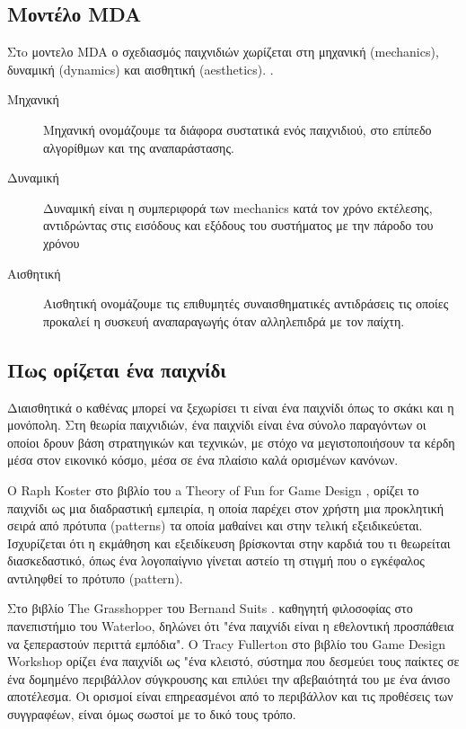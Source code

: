 	\subsection{Μοντέλο MDA}
	Στo μοντελο \gls{MDA} ο σχεδιασμός παιχνιδιών χωρίζεται στη μηχανική (mechanics), δυναμική (dynamics) και αισθητική (aesthetics).
	\cite{mda04}.
	
	\begin{description}
	\item [Μηχανική] Μηχανική ονομάζουμε τα διάφορα συστατικά ενός παιχνιδιού, στο επίπεδο αλγορίθμων και της αναπαράστασης.
	\item [Δυναμική] Δυναμική είναι η συμπεριφορά των mechanics κατά τον χρόνο εκτέλεσης, αντιδρώντας στις εισόδους και εξόδους του συστήματος με την πάροδο του χρόνου
	\item [Αισθητική] Αισθητική ονομάζουμε τις επιθυμητές συναισθηματικές αντιδράσεις τις οποίες προκαλεί η συσκευή αναπαραγωγής όταν αλληλεπιδρά με τον παίχτη.	
	\end{description}

\subsection{Πως ορίζεται ένα παιχνίδι}
Διαισθητικά ο καθένας μπορεί να ξεχωρίσει τι είναι ένα παιχνίδι όπως το σκάκι και η μονόπολη. Στη θεωρία παιχνιδιών, ένα παιχνίδι είναι ένα σύνολο παραγόντων οι οποίοι δρουν βάση στρατηγικών και τεχνικών, με στόχο να μεγιστοποιήσουν τα κέρδη μέσα στον εικονικό κόσμο, μέσα σε ένα πλαίσιο καλά ορισμένων κανόνων.

Ο Raph Koster στο βιβλίο του a Theory of Fun for Game Design \cite{koster04}, ορίζει το παιχνίδι ως μια διαδραστική εμπειρία, η οποία παρέχει στον χρήστη μια προκλητική σειρά από πρότυπα (patterns) τα οποία μαθαίνει και στην τελική εξειδικεύεται. Ισχυρίζεται ότι η εκμάθηση και εξειδίκευση βρίσκονται στην καρδιά του τι θεωρείται διασκεδαστικό, όπως ένα λογοπαίγνιο γίνεται αστείο τη στιγμή που ο εγκέφαλος αντιληφθεί το πρότυπο (pattern).

Στο βιβλίο The Grasshopper του Bernand Suits  \cite{suits2005grasshopper}. καθηγητή φιλοσοφίας στο πανεπιστήμιο του Waterloo, δηλώνει ότι "ένα παιχνίδι είναι η εθελοντική προσπάθεια να ξεπεραστούν περιττά εμπόδια".
O Tracy Fullerton στο βιβλίο του Game Design Workshop \cite{fullerton2008game} ορίζει ένα παιχνίδι ως "ένα κλειστό, σύστημα που δεσμεύει τους παίκτες σε ένα δομημένο περιβάλλον σύγκρουσης και επιλύει την αβεβαιότητά του με ένα άνισο αποτέλεσμα. Oι ορισμοί είναι επηρεασμένοι από το περιβάλλον και τις προθέσεις των συγγραφέων, είναι όμως σωστοί με το δικό τους τρόπο.

